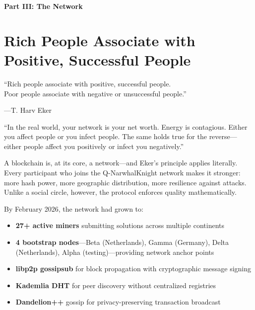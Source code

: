 \documentclass[11pt,a4paper]{article}
\begin{document}
\newpage
\begin{center}
{\LARGE\bfseries\color{quggreen!80!black} Part III: The Network}\\[0.3cm]
\end{center}
\vspace{0.5cm}

\section{Rich People Associate with Positive, Successful People}

\epigraph{``Rich people associate with positive, successful people.\\
Poor people associate with negative or unsuccessful people.''}%
{---T. Harv Eker}

\begin{wealthbox}[title={\raisebox{-0.5pt}{\tiny$\bigstar$} Wealth File \#7}]
``In the real world, your network is your net worth. Energy is contagious.
Either you affect people or you infect people. The same holds true for
the reverse---either people affect you positively or infect you
negatively.''
\end{wealthbox}

\vspace{0.3cm}

A blockchain is, at its core, a network---and Eker's principle applies
literally. Every participant who joins the Q-NarwhalKnight network
makes it stronger: more hash power, more geographic distribution, more
resilience against attacks. Unlike a social circle, however, the
protocol enforces quality mathematically.

By February 2026, the network had grown to:

\begin{itemize}[leftmargin=2em]
    \item \textbf{27+ active miners} submitting solutions across multiple continents
    \item \textbf{4 bootstrap nodes}---Beta (Netherlands), Gamma (Germany),
          Delta (Netherlands), Alpha (testing)---providing network anchor points
    \item \textbf{libp2p gossipsub} for block propagation with cryptographic
          message signing
    \item \textbf{Kademlia DHT} for peer discovery without centralized registries
    \item \textbf{Dandelion++} gossip for privacy-preserving transaction
          broadcast
\end{itemize}
\end{document}
